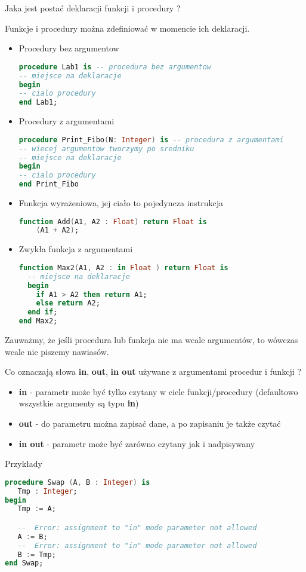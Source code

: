 \documentclass[a4paper,15pt]{article}
\newcommand{\ask}[2]{
    \begin{tcolorbox}[colback=black!5!white,colframe=gray,title={Pytanie #1}]
        #2
    \end{tcolorbox}
}
\begin{document}
\ask{}{
Jaka jest postać deklaracji funkcji i procedury ?
}
Funkcje i procedury można zdefiniować w momencie ich deklaracji. 
\begin{itemize}
\item Procedury bez argumentow
\begin{lstlisting}[language=Ada]
procedure Lab1 is -- procedura bez argumentow
-- miejsce na deklaracje
begin
-- cialo procedury
end Lab1;
\end{lstlisting}
\item Procedury z argumentami
\begin{lstlisting}[language=Ada]
procedure Print_Fibo(N: Integer) is -- procedura z argumentami
-- wiecej argumentow tworzymy po sredniku
-- miejsce na deklaracje
begin
-- cialo procedury
end Print_Fibo
\end{lstlisting}
\item Funkcja wyrażeniowa, jej ciało to pojedyncza instrukcja
\begin{lstlisting}[language=Ada]
function Add(A1, A2 : Float) return Float is
    (A1 + A2);
\end{lstlisting}
\item Zwykła funkcja z argumentami
\begin{lstlisting}[language=Ada]
function Max2(A1, A2 : in Float ) return Float is
  -- miejsce na deklaracje
  begin
    if A1 > A2 then return A1;
    else return A2; 
  end if;
end Max2;   
\end{lstlisting}
\end{itemize}

Zauważmy, że jeśli procedura lub funkcja nie ma wcale argumentów, to wówczas wcale nie piszemy nawiasów. 

\ask{}{
Co oznaczają słowa \textbf{in}, \textbf{out}, \textbf{in out} używane z argumentami procedur i funkcji ?
}
\begin{itemize}
\item \textbf{in} - parametr może być tylko czytany w ciele funkcji/procedury (defaultowo wszystkie argumenty są typu \textbf{in})
\item \textbf{out} - do parametru można zapisać dane, a po zapisaniu je także czytać
\item \textbf{in out} - parametr może być zarówno czytany jak i nadpisywany
\end{itemize}

Przykłady

\begin{lstlisting}[language=Ada, caption=Blad - nadpisywanie in]
procedure Swap (A, B : Integer) is
   Tmp : Integer;
begin
   Tmp := A;

   --  Error: assignment to "in" mode parameter not allowed
   A := B;
   --  Error: assignment to "in" mode parameter not allowed
   B := Tmp;
end Swap;
\end{lstlisting}
\end{document}
